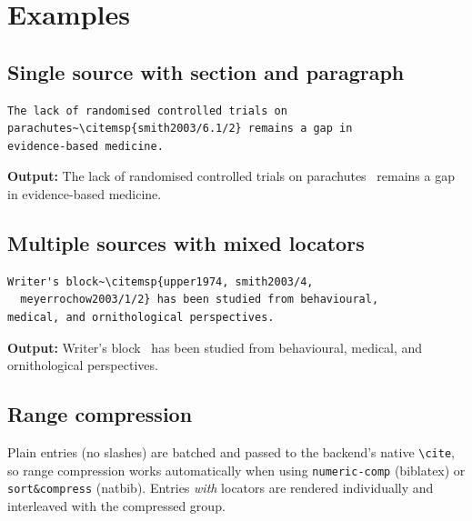 \documentclass[11pt, a4paper]{article}
\newcommand{\cmd}[1]{\texttt{\textbackslash #1}}
\begin{document}
\section{Examples}


\subsection{Single source with section and paragraph}

\begin{tcolorbox}[colback=blue!3, colframe=blue!30, boxrule=0.5pt, arc=2pt, top=6pt, bottom=6pt, left=10pt, right=10pt]
\begin{verbatim}
The lack of randomised controlled trials on
parachutes~\citemsp{smith2003/6.1/2} remains a gap in
evidence-based medicine.
\end{verbatim}
\end{tcolorbox}

\noindent\textbf{Output:} The lack of randomised controlled trials on
parachutes~ remains a gap in evidence-based
medicine.


\subsection{Multiple sources with mixed locators}

\begin{tcolorbox}[colback=blue!3, colframe=blue!30, boxrule=0.5pt, arc=2pt, top=6pt, bottom=6pt, left=10pt, right=10pt]
\begin{verbatim}
Writer's block~\citemsp{upper1974, smith2003/4,
  meyerrochow2003/1/2} has been studied from behavioural,
medical, and ornithological perspectives.
\end{verbatim}
\end{tcolorbox}

\noindent\textbf{Output:} Writer's
block~ has been
studied from behavioural, medical, and ornithological perspectives.


\subsection{Range compression}

Plain entries (no slashes) are batched and passed to the backend's native \cmd{cite}, so range compression works automatically when using \texttt{numeric-comp} (biblatex) or \texttt{sort\&compress} (natbib). Entries \emph{with} locators are rendered individually and interleaved with the compressed group.
\end{document}
